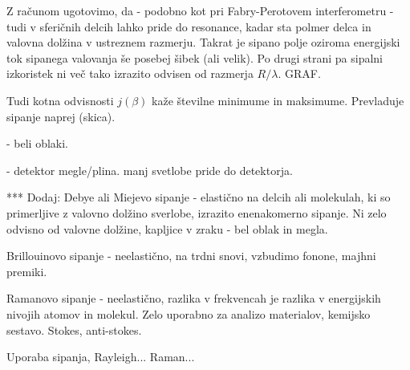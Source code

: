 Z računom ugotovimo, da - podobno kot pri Fabry-Perotovem interferometru - tudi v sferičnih delcih
lahko pride do resonance, kadar sta polmer delca in valovna dolžina v ustreznem razmerju. Takrat 
je sipano polje oziroma energijski tok sipanega valovanja še posebej šibek (ali velik). Po drugi
strani  pa sipalni izkoristek ni več tako izrazito odvisen od razmerja $R/\lambda$. GRAF. 

Tudi kotna odvisnosti $j(\beta)$ kaže številne minimume in maksimume. Prevladuje sipanje naprej (skica).


- beli oblaki.

- detektor megle/plina. manj svetlobe pride do detektorja.

***
Dodaj: 
Debye ali Miejevo sipanje - elastično na delcih ali molekulah, ki so primerljive
z valovno dolžino sverlobe, izrazito enenakomerno sipanje. Ni zelo odvisno od
valovne dolžine, kapljice v zraku - bel oblak in megla. 

Brillouinovo sipanje - neelastično, na trdni snovi, vzbudimo fonone, majhni premiki.

Ramanovo sipanje - neelastično, razlika v frekvencah je razlika v energijskih 
nivojih atomov in molekul. Zelo uporabno za analizo materialov, kemijsko sestavo.
Stokes, anti-stokes. 

Uporaba sipanja, Rayleigh... Raman... 

